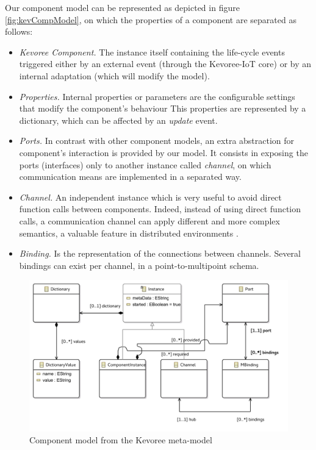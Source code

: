 Our component model can be represented as depicted in figure \ref{fig:kevCompModel}, on which the properties of a component are separated as follows:
\begin{itemize}
	\item \textit{Kevoree Component.} The instance itself containing the life-cycle events triggered either by an external event (through the Kevoree-IoT core) or by an internal adaptation (which will modify the model).
	\item \textit{Properties.} Internal properties or parameters are the configurable settings that modify the component's behaviour
	This properties are represented by a dictionary, which can be affected by an \textit{update} event.
	\item \textit{Ports.} In contrast with other component models, an extra abstraction for component's interaction is provided by our model.
	It consists in exposing the ports (interfaces) only to another instance called \textit{channel}, on which communication means are implemented in a separated way.
	\item \textit{Channel.} An independent instance which is very useful to avoid direct function calls between components.
	Indeed, instead of using direct function calls, a communication channel can apply different and more complex semantics, a valuable feature in distributed environments \cite{fouquet2013kevoree, barais2005construire}.
	\item \textit{Binding.} Is the representation of the connections between channels. Several bindings can exist per channel, in a point-to-multipoint schema.
\end{itemize}

\begin{figure}[htb]
	\centering
	\includegraphics[width=0.95\columnwidth]{chapters/calpulli.images/ComponentModelUML.pdf}
	\caption{Component model from the Kevoree meta-model} \label{fig:kevCompModelUML}
\end{figure}


